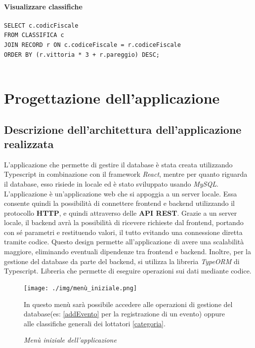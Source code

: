 \documentclass[a4paper,12pt]{report}
\begin{document}
\subsubsection{Visualizzare classifiche}
\begin{verbatim}
SELECT c.codicFiscale
FROM CLASSIFICA c
JOIN RECORD r ON c.codiceFiscale = r.codiceFiscale
ORDER BY (r.vittoria * 3 + r.pareggio) DESC;
    
\end{verbatim}

\chapter{Progettazione dell'applicazione}
\section{Descrizione dell'architettura dell'applicazione realizzata}
L'applicazione che permette di gestire il database è stata creata utilizzando \textrm{Typescript} in combinazione con il framework 
\emph{React}, mentre per quanto riguarda il database, esso risiede in locale ed è stato sviluppato usando \emph{MySQL}.
L'applicazione è un'applicazione web che si appoggia a un server locale. Essa consente quindi la possibilità di connettere 
frontend e backend utilizzando il protocollo \textbf{HTTP}, e quindi attraverso delle \textbf{API REST}. Grazie a un server locale, 
il backend avrà la possibilità di ricevere richieste dal frontend, portando con sé parametri e restituendo valori, il tutto 
evitando una connessione diretta tramite codice. Questo design permette all'applicazione di avere una scalabilità maggiore, eliminando 
eventuali dipendenze tra frontend e backend. Inoltre, per la gestione del database da parte del backend, si utilizza la libreria 
\emph{TypeORM} di \textrm{Typescript}. Libreria che permette di eseguire operazioni sui dati mediante codice.

\begin{figure}
    \centering
    \texttt{[image: ./img/menù\_iniziale.png]}
    \caption{\textit{Menù iniziale dell'applicazione}}
    \medskip
    In questo menù sarà possibile accedere alle operazioni di gestione del database(es: \ref{addEvento} per la registrazione di un evento) 
    oppure alle classifiche generali dei lottatori \ref{categoria}.
\end{figure}
\end{document}
